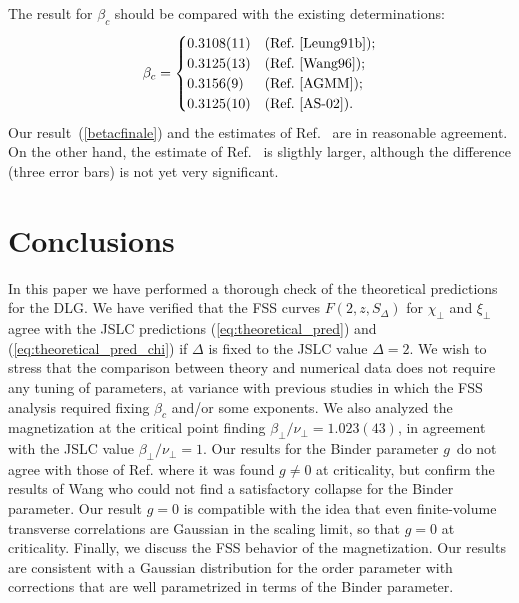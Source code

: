 \documentclass[12pt]{article}
\begin{document}
The result for $\beta_c$ should be compared with the existing determinations:
\begin{equation}
\beta_c = \begin{cases}
0.3108(11) & \text{(Ref.~\cite{Leung91b})}; \\
0.3125(13) & \text{(Ref.~\cite{Wang96})}; \\
0.3156(9) & \text{(Ref.~\cite{AGMM})}; \\
0.3125(10) & \text{(Ref.~\cite{AS-02})}. \\
\end{cases}
\end{equation}
Our result~(\ref{betacfinale}) and the estimates of 
Ref.~\cite{Leung91b,Wang96,AS-02} are in reasonable agreement. On the other 
hand, the estimate of Ref.~\cite{AGMM} is sligthly larger, 
although the difference (three error bars) is not yet very significant.


\section{Conclusions}
\label{sec:conclusions}

In this paper we have performed a thorough check of the theoretical predictions
for the DLG. We have verified that the FSS curves $F(2,z,S_\Delta)$ for 
$\chi_\bot$ and $\xi_\bot$ agree with the JSLC predictions 
(\ref{eq:theoretical_pred}) and (\ref{eq:theoretical_pred_chi}) if 
$\Delta$ is fixed to the JSLC value $\Delta=2$. We wish to stress 
that the comparison between theory and numerical data 
does not require any tuning of parameters, at variance with previous 
studies in which the FSS analysis required fixing 
$\beta_c$ and/or some exponents. We also analyzed the magnetization at 
the critical point finding $\beta_\bot/\nu_\bot = 1.023(43)$, 
in agreement with the JSLC value $\beta_\bot/\nu_\bot = 1$.
Our results for the Binder parameter $g$\ do not agree with those
of Ref. \cite{Leung92} where it was found
$g\not=0$ at criticality, but confirm 
the results of Wang \cite{Wang96} who could not find a satisfactory
collapse for the Binder parameter. Our result $g=0$ is compatible
with the idea that even finite-volume transverse correlations
are Gaussian in the scaling limit, so that $g=0$ at
criticality. Finally, we discuss the FSS behavior of the magnetization.
Our results are consistent with a Gaussian distribution for the 
order parameter with corrections that are well parametrized in
terms of the Binder parameter.
\end{document}
